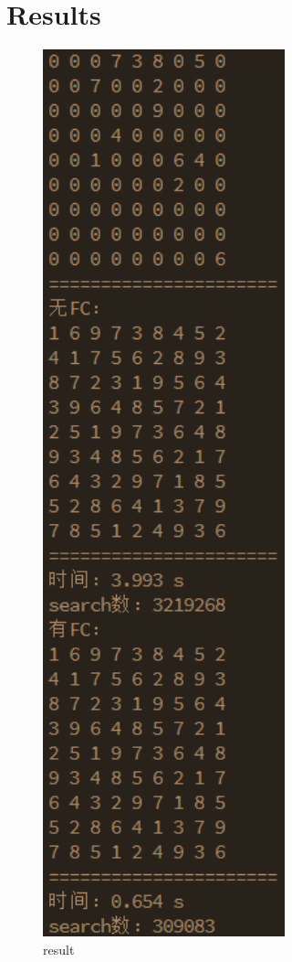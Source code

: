 \documentclass[a4paper, 11pt]{article}
\begin{document}
\section{Results}
\begin{figure}[ht]
	\centering
	\includegraphics[width=7cm]{result.png}
	\caption{result}
\end{figure}


%
%
\end{document}
